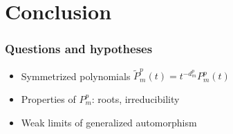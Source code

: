 \section{Conclusion}
\begin{frame}
\frametitle{Questions and hypotheses}
\begin{itemize}
\item Symmetrized polynomials $\tilde{P}_m^p(t)=t^{-d^p_m}P_m^p(t)$
\item Properties of $P_m^p$: roots, irreducibility
\item Weak limits of generalized automorphism
\end{itemize}
\end{frame}